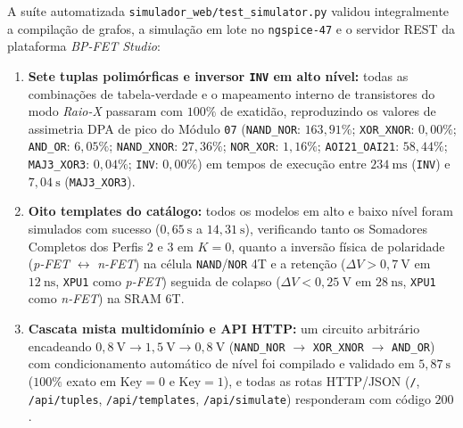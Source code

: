 A su\'{i}te automatizada \texttt{simulador\_web/test\_simulator.py} validou integralmente a compila\c{c}\~{a}o de grafos, a simula\c{c}\~{a}o em lote no \texttt{ngspice-47} e o servidor REST da plataforma \textit{BP-FET Studio}:
\begin{enumerate}
    \item \textbf{Sete tuplas polim\'{o}rficas e inversor \texttt{INV} em alto n\'{i}vel:} todas as combina\c{c}\~{o}es de tabela-verdade e o mapeamento interno de transistores do modo \textit{Raio-X} passaram com $100\%$ de exatid\~{a}o, reproduzindo os valores de assimetria DPA de pico do M\'{o}dulo \texttt{07} (\texttt{NAND\_NOR}: $163{,}91\%$; \texttt{XOR\_XNOR}: $0{,}00\%$; \texttt{AND\_OR}: $6{,}05\%$; \texttt{NAND\_XNOR}: $27{,}36\%$; \texttt{NOR\_XOR}: $1{,}16\%$; \texttt{AOI21\_OAI21}: $58{,}44\%$; \texttt{MAJ3\_XOR3}: $0{,}04\%$; \texttt{INV}: $0{,}00\%$) em tempos de execu\c{c}\~{a}o entre $234\ \text{ms}$ (\texttt{INV}) e $7{,}04\ \text{s}$ (\texttt{MAJ3\_XOR3}).
    \item \textbf{Oito templates do cat\'{a}logo:} todos os modelos em alto e baixo n\'{i}vel foram simulados com sucesso ($0{,}65\ \text{s}$ a $14{,}31\ \text{s}$), verificando tanto os Somadores Completos dos Perfis 2 e 3 em $K=0$, quanto a invers\~{a}o f\'{i}sica de polaridade (\textit{p-FET} $\leftrightarrow$ \textit{n-FET}) na c\'{e}lula \texttt{NAND}/\texttt{NOR} 4T e a reten\c{c}\~{a}o ($\Delta V > 0{,}7\ \text{V}$ em $12\ \text{ns}$, \texttt{XPU1} como \textit{p-FET}) seguida de colapso ($\Delta V < 0{,}25\ \text{V}$ em $28\ \text{ns}$, \texttt{XPU1} como \textit{n-FET}) na SRAM 6T.
    \item \textbf{Cascata mista multidom\'{i}nio e API HTTP:} um circuito arbitr\'{a}rio encadeando $0{,}8\ \text{V} \to 1{,}5\ \text{V} \to 0{,}8\ \text{V}$ (\texttt{NAND\_\allowbreak NOR} $\to$ \texttt{XOR\_\allowbreak XNOR} $\to$ \texttt{AND\_\allowbreak OR}) com condicionamento autom\'{a}tico de n\'{i}vel foi compilado e validado em $5{,}87\ \text{s}$ ($100\%$ exato em $\text{Key}=0$ e $\text{Key}=1$), e todas as rotas HTTP/JSON (\texttt{/}, \texttt{/api/\allowbreak tuples}, \texttt{/api/\allowbreak templates}, \texttt{/api/\allowbreak simulate}) responderam com c\'{o}digo $200$.
\end{enumerate}
